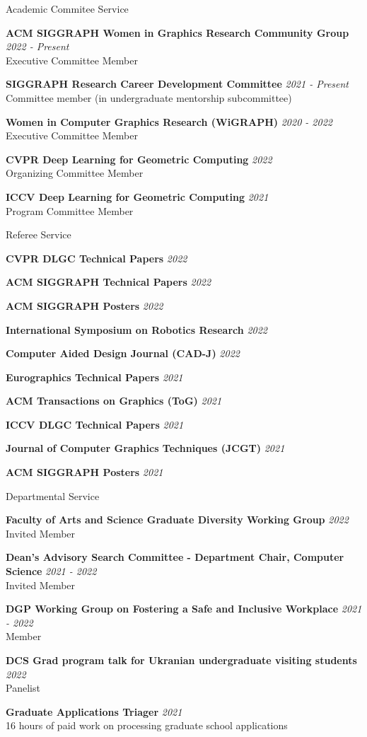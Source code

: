 \documentclass{resume}
\newcommand{\cvitem}[3]{
    {\bf #1} \hfill {\em \small #2} \\ 
    {\small#3 }
}
\newcommand{\cvitemtiny}[2]{
    {\bf #1} \hfill {\em \small #2}
}
\begin{document}
\begin{rSection}{Academic Commitee Service}

\cvitem{ACM SIGGRAPH Women in Graphics Research Community Group}{2022 - Present}{Executive Committee Member}

\cvitem{SIGGRAPH Research Career Development Committee}{2021 - Present}{Committee member (in undergraduate mentorship subcommittee)}

\cvitem{Women in Computer Graphics Research (WiGRAPH)}{2020 - 2022}{Executive Committee Member}

\cvitem{CVPR Deep Learning for Geometric Computing}{2022}{Organizing Committee Member}

\cvitem{ICCV Deep Learning for Geometric Computing}{2021}{Program Committee Member}

\end{rSection}

\begin{rSection}{Referee Service}

\cvitemtiny{CVPR DLGC Technical Papers}{2022}

\cvitemtiny{ACM SIGGRAPH Technical Papers}{2022}

\cvitemtiny{ACM SIGGRAPH Posters}{2022}

\cvitemtiny{International Symposium on Robotics Research}{2022}

\cvitemtiny{Computer Aided Design Journal (CAD-J)}{2022}

\cvitemtiny{Eurographics Technical Papers}{2021}

\cvitemtiny{ACM Transactions on Graphics (ToG)}{2021}

\cvitemtiny{ICCV DLGC Technical Papers}{2021}

\cvitemtiny{Journal of Computer Graphics Techniques (JCGT)}{2021}

\cvitemtiny{ACM SIGGRAPH Posters}{2021}

\end{rSection}

\begin{rSection}{Departmental Service}

    
\cvitem{Faculty of Arts and Science Graduate Diversity Working Group}{2022}{Invited Member}

\cvitem{Dean's Advisory Search Committee -  Department Chair, Computer Science}{2021 - 2022}{Invited Member}

\cvitem{DGP Working Group on Fostering a Safe and Inclusive Workplace}{2021 - 2022}{Member}

\cvitem{DCS Grad program talk for Ukranian undergraduate visiting students}{2022}{Panelist}

\cvitem{Graduate Applications Triager}{2021}{16 hours of paid work on processing graduate school applications}




\end{rSection}
\end{document}
